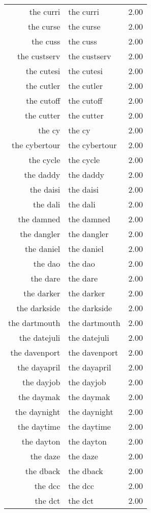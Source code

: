 \begin{table}[ht]
\begin{tabular}{rlr}
  the curri & the curri & 2.00 \\ 
  the curse & the curse & 2.00 \\ 
  the cuss & the cuss & 2.00 \\ 
  the custserv & the custserv & 2.00 \\ 
  the cutesi & the cutesi & 2.00 \\ 
  the cutler & the cutler & 2.00 \\ 
  the cutoff & the cutoff & 2.00 \\ 
  the cutter & the cutter & 2.00 \\ 
  the cy & the cy & 2.00 \\ 
  the cybertour & the cybertour & 2.00 \\ 
  the cycle & the cycle & 2.00 \\ 
  the daddy & the daddy & 2.00 \\ 
  the daisi & the daisi & 2.00 \\ 
  the dali & the dali & 2.00 \\ 
  the damned & the damned & 2.00 \\ 
  the dangler & the dangler & 2.00 \\ 
  the daniel & the daniel & 2.00 \\ 
  the dao & the dao & 2.00 \\ 
  the dare & the dare & 2.00 \\ 
  the darker & the darker & 2.00 \\ 
  the darkside & the darkside & 2.00 \\ 
  the dartmouth & the dartmouth & 2.00 \\ 
  the datejuli & the datejuli & 2.00 \\ 
  the davenport & the davenport & 2.00 \\ 
  the dayapril & the dayapril & 2.00 \\ 
  the dayjob & the dayjob & 2.00 \\ 
  the daymak & the daymak & 2.00 \\ 
  the daynight & the daynight & 2.00 \\ 
  the daytime & the daytime & 2.00 \\ 
  the dayton & the dayton & 2.00 \\ 
  the daze & the daze & 2.00 \\ 
  the dback & the dback & 2.00 \\ 
  the dcc & the dcc & 2.00 \\ 
  the dct & the dct & 2.00 \\ 

\end{tabular}
\end{table}
